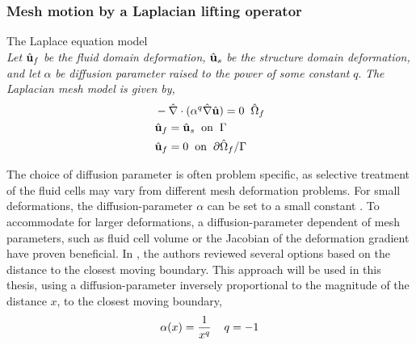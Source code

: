 \subsubsection*{Mesh motion by a Laplacian lifting operator}
\begin{equat}
The Laplace equation model \\ \textit{Let} $\hat{\mathbf{u}}_f$ \textit{be the fluid domain deformation,} $\hat{\mathbf{u}}_s$ \textit{be the structure domain deformation, and let} $\alpha$ \textit{be diffusion parameter raised to the power of some constant} $q$. \textit{The Laplacian mesh model is given by, }  
\begin{align*}
&- \hat{\nabla} \cdot (\alpha^q \hat{\nabla} \hat{\mathbf{u}}) = 0 \hspace{2mm} \hat{\Omega}_f\\
&\hat{\mathbf{u}}_f = \hat{\mathbf{u}}_s \hspace{2mm} \text{on} \hspace{2mm} \Gamma \\
&\hat{\mathbf{u}}_f = 0 \hspace{2mm} \text{on} \hspace{2mm} \partial \hat{\Omega}_f / \Gamma 
\end{align*}
\end{equat}
The choice of diffusion parameter is often problem specific, as selective treatment of the fluid cells may vary from different mesh deformation problems. For small deformations, the diffusion-parameter $\alpha$ can be set to a small constant \cite{Wick2013, Richter2010c}. To accommodate for larger deformations, a diffusion-parameter dependent of mesh parameters, such as fluid cell volume \cite{Crumpton1995} or the Jacobian of the deformation gradient \cite{Stein} have proven beneficial. In \cite{Jasak2006}, the authors reviewed several options based on the distance to the closest moving boundary. This approach will be used in this thesis, using a diffusion-parameter inversely proportional to the magnitude of the distance $x$, to the closest moving boundary,
\begin{align*}
\alpha(x) = \frac{1}{x^q} \hspace{4mm} q = -1
\end{align*}

\newpage
